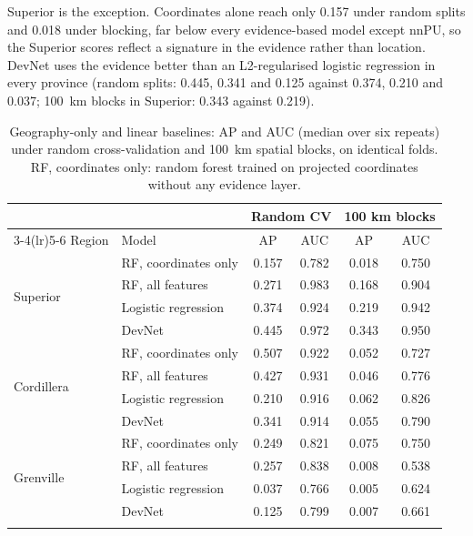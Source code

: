 \documentclass[pdflatex,sn-apa]{sn-jnl}
\begin{document}
Superior is the exception. Coordinates alone reach only 0.157 under random splits and 0.018 under blocking, far below every evidence-based model except nnPU, so the Superior scores reflect a signature in the evidence rather than location. DevNet uses the evidence better than an L2-regularised logistic regression in every province (random splits: 0.445, 0.341 and 0.125 against 0.374, 0.210 and 0.037; 100~km blocks in Superior: 0.343 against 0.219).

\begin{table}[t]
\caption{Geography-only and linear baselines: AP and AUC (median over six repeats) under random cross-validation and 100~km spatial blocks, on identical folds. RF, coordinates only: random forest trained on projected coordinates without any evidence layer.}\label{tab:geography}
\footnotesize
\setlength{\tabcolsep}{3pt}
\begin{tabular*}{\textwidth}{@{\extracolsep\fill}llcccc}
\toprule
 & & \multicolumn{2}{c}{Random CV} & \multicolumn{2}{c}{100 km blocks} \\
\cmidrule(lr){3-4}\cmidrule(lr){5-6}
Region & Model & AP & AUC & AP & AUC \\
\midrule
\multirow{4}{*}{Superior} & RF, coordinates only & 0.157 & 0.782 & 0.018 & 0.750 \\
 & RF, all features & 0.271 & 0.983 & 0.168 & 0.904 \\
 & Logistic regression & 0.374 & 0.924 & 0.219 & 0.942 \\
 & DevNet & 0.445 & 0.972 & 0.343 & 0.950 \\
\midrule
\multirow{4}{*}{Cordillera} & RF, coordinates only & 0.507 & 0.922 & 0.052 & 0.727 \\
 & RF, all features & 0.427 & 0.931 & 0.046 & 0.776 \\
 & Logistic regression & 0.210 & 0.916 & 0.062 & 0.826 \\
 & DevNet & 0.341 & 0.914 & 0.055 & 0.790 \\
\midrule
\multirow{4}{*}{Grenville} & RF, coordinates only & 0.249 & 0.821 & 0.075 & 0.750 \\
 & RF, all features & 0.257 & 0.838 & 0.008 & 0.538 \\
 & Logistic regression & 0.037 & 0.766 & 0.005 & 0.624 \\
 & DevNet & 0.125 & 0.799 & 0.007 & 0.661 \\
\botrule
\end{tabular*}
\end{table}
\end{document}
